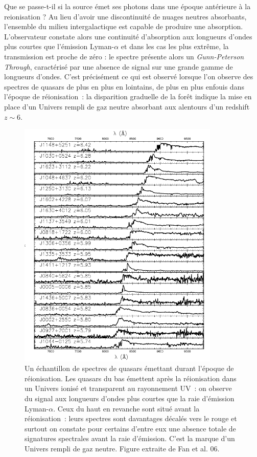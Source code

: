 Que se passe-t-il si la source émet ses photons dans une époque antérieure à la reionisation ? Au lieu d'avoir une discontinuité de nuages neutres absorbants, l'ensemble du milieu intergalactique est capable de produire une absorption. L'observateur constate alors une continuité d'absorption aux longueurs d'ondes plus courtes que l'émission Lyman-$\alpha$ et dans les cas les plus extrême, la transmission est proche de zéro : le spectre présente alors un \textit{Gunn-Peterson Through}, caractérisé par une absence de signal sur une grande gamme de longueurs d'ondes. C'est précisément ce qui est observé lorsque l'on observe des spectres de quasars de plus en plus en lointains, de plus en plus enfouis dans l'époque de réionisation~: la disparition graduelle de la forêt indique la mise en place d'un Univers rempli de gaz neutre absorbant aux alentours d'un redshift $z\sim 6$.
\begin{figure}[htbp]
	\centering
		\includegraphics[height=12cm]{figs/fan06.png}
		\caption[Spectres de quasars durant la réionisation]{Un échantillon de spectres de quasars émettant durant l'époque de réionisation. Les quasars du bas émettent après la réionisation dans un Univers ionisé et transparent au rayonnement UV~: on observe du signal aux longueurs d'ondes plus courtes que la raie d'émission Lyman-$\alpha$. Ceux du haut en revanche sont situé avant la réionisation~: leurs spectres sont davantages décalés vers le rouge et surtout on constate pour certains d'entre eux une absence totale de signatures spectrales avant la raie d'émission. C'est la marque d'un Univers rempli de gaz neutre. Figure extraite de Fan et al. 06.}
	\label{f:fan06}
\end{figure}

